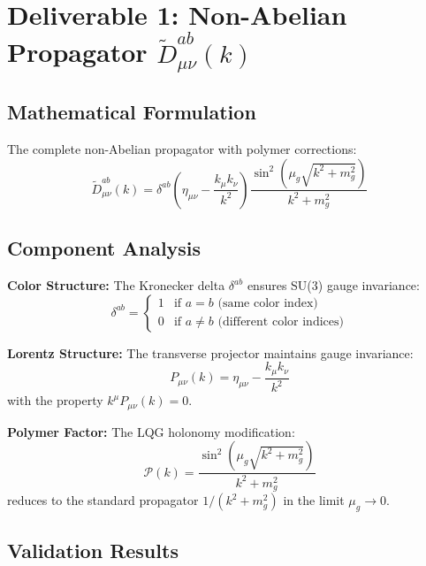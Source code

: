 \documentclass[11pt]{article}
\begin{document}
\section{Deliverable 1: Non-Abelian Propagator $\tilde{D}^{ab}_{\mu\nu}(k)$}

\subsection{Mathematical Formulation}

The complete non-Abelian propagator with polymer corrections:
\begin{equation}
\boxed{\tilde{D}^{ab}_{\mu\nu}(k) = \delta^{ab} \left(\eta_{\mu\nu} - \frac{k_\mu k_\nu}{k^2}\right) \frac{\sin^2(\mu_g\sqrt{k^2 + m_g^2})}{k^2 + m_g^2}}
\end{equation}

\subsection{Component Analysis}

\textbf{Color Structure:} The Kronecker delta $\delta^{ab}$ ensures SU(3) gauge invariance:
\begin{equation}
\delta^{ab} = \begin{cases}
1 & \text{if } a = b \text{ (same color index)} \\
0 & \text{if } a \neq b \text{ (different color indices)}
\end{cases}
\end{equation}

\textbf{Lorentz Structure:} The transverse projector maintains gauge invariance:
\begin{equation}
P_{\mu\nu}(k) = \eta_{\mu\nu} - \frac{k_\mu k_\nu}{k^2}
\end{equation}
with the property $k^\mu P_{\mu\nu}(k) = 0$.

\textbf{Polymer Factor:} The LQG holonomy modification:
\begin{equation}
\mathcal{P}(k) = \frac{\sin^2(\mu_g\sqrt{k^2 + m_g^2})}{k^2 + m_g^2}
\end{equation}
reduces to the standard propagator $1/(k^2 + m_g^2)$ in the limit $\mu_g \to 0$.

\subsection{Validation Results}
\end{document}
